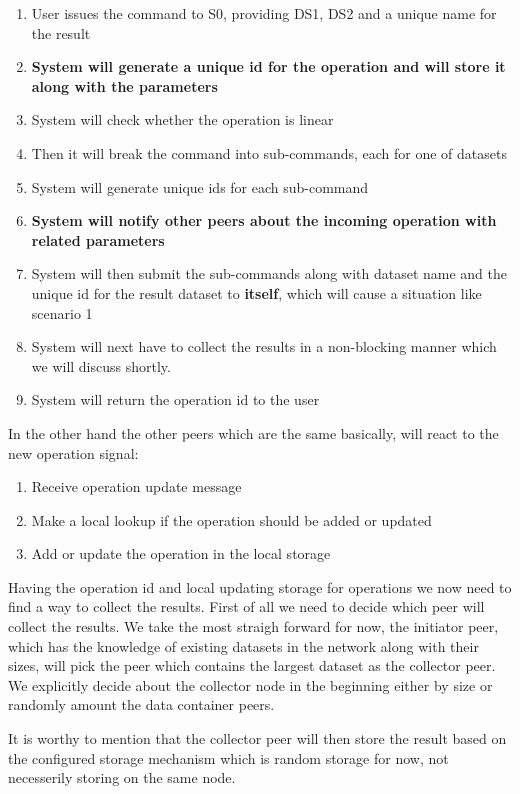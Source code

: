 \begin{enumerate}
\item User issues the command to S0, providing DS1, DS2 and a unique name for the result
\item \textbf{System will generate a unique id for the operation and will store it along with the parameters}
\item System will check whether the operation is linear
\item Then it will break the command into sub-commands, each for one of datasets
\item System will generate unique ids for each sub-command
\item \textbf{System will notify other peers about the incoming operation with related parameters}
\item System will then submit the sub-commands along with dataset name and the unique id for the result dataset
to \textbf{itself}, which will cause a situation like scenario 1
\item System will next have to collect the results in a non-blocking manner which we will discuss shortly.
\item System will return the operation id to the user
\end{enumerate}

In the other hand the other peers which are the same basically, will react to the new operation signal:

\begin{enumerate}
\item Receive operation update message
\item Make a local lookup if the operation should be added or updated
\item Add or update the operation in the local storage
\end{enumerate}

Having the operation id and local updating storage for operations we now need to find a way to collect the results.
First of all we need to decide which peer will collect the results. We take the most straigh forward for now, the 
initiator peer, which has the knowledge of existing datasets in the network along with their sizes, will pick the 
peer which contains the largest dataset as the collector peer. We explicitly decide about the collector node in the
beginning either by size or randomly amount the data container peers.

It is worthy to mention that the collector peer will then store the result based on the configured storage mechanism 
which is random storage for now, not necesserily storing on the same node.

